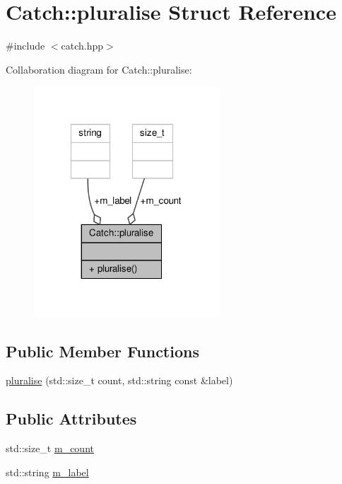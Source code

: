 \hypertarget{struct_catch_1_1pluralise}{\section{Catch\-:\-:pluralise Struct Reference}
\label{struct_catch_1_1pluralise}
}


{\ttfamily \#include $<$catch.\-hpp$>$}



Collaboration diagram for Catch\-:\-:pluralise\-:
\nopagebreak
\begin{figure}[H]
\begin{center}
\leavevmode
\includegraphics[width=197pt]{struct_catch_1_1pluralise__coll__graph}
\end{center}
\end{figure}
\subsection*{Public Member Functions}
\begin{DoxyCompactItemize}
\item 
\hyperlink{struct_catch_1_1pluralise_a5c55e22de2416cfe416edf715c6b9234}{pluralise} (std\-::size\-\_\-t count, std\-::string const \&label)
\end{DoxyCompactItemize}
\subsection*{Public Attributes}
\begin{DoxyCompactItemize}
\item 
std\-::size\-\_\-t \hyperlink{struct_catch_1_1pluralise_a4dce2fa13ec6f00fac09b2418265441e}{m\-\_\-count}
\item 
std\-::string \hyperlink{struct_catch_1_1pluralise_a8849cbdd3f11ebe7747597c8644e8793}{m\-\_\-label}
\end{DoxyCompactItemize}
